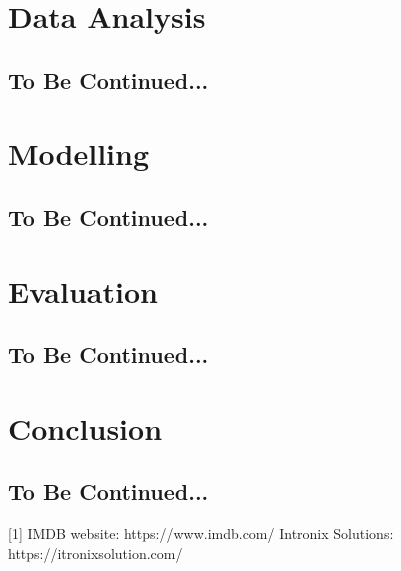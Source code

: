 \documentclass{article}
\begin{document}
\section{Data Analysis}
\subsection{To Be Continued...}
\section{Modelling}
\subsection{To Be Continued...}
\section{Evaluation}
\subsection{To Be Continued...}
\section{Conclusion}
\subsection{To Be Continued...}
\newpage


[1] IMDB website:  https://www.imdb.com/
\newline
[2] Intronix Solutions: https://itronixsolution.com/
\end{document}
